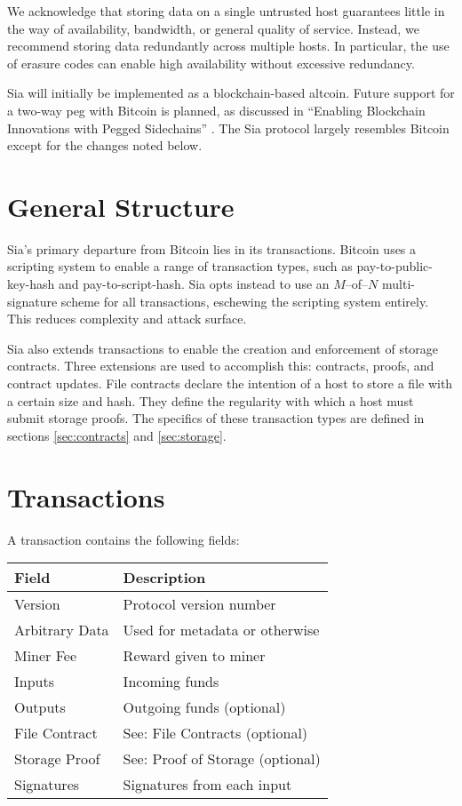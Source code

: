\documentclass[twocolumn]{article}
\begin{document}
We acknowledge that storing data on a single untrusted host guarantees little in the way of availability, bandwidth, or general quality of service.
Instead, we recommend storing data redundantly across multiple hosts.
In particular, the use of erasure codes can enable high availability without excessive redundancy.

Sia will initially be implemented as a blockchain-based altcoin.
Future support for a two-way peg with Bitcoin is planned, as discussed in ``Enabling Blockchain Innovations with Pegged Sidechains'' \cite{side}.
The Sia protocol largely resembles Bitcoin except for the changes noted below.

\section{General Structure}
Sia's primary departure from Bitcoin lies in its transactions.
Bitcoin uses a scripting system to enable a range of transaction types, such as pay-to-public-key-hash and pay-to-script-hash.
Sia opts instead to use an $M$--of--$N$ multi-signature scheme for all transactions, eschewing the scripting system entirely.
This reduces complexity and attack surface.

Sia also extends transactions to enable the creation and enforcement of storage contracts.
Three extensions are used to accomplish this: contracts, proofs, and contract updates.
File contracts declare the intention of a host to store a file with a certain size and hash.
They define the regularity with which a host must submit storage proofs.
The specifics of these transaction types are defined in sections \ref{sec:contracts} and \ref{sec:storage}.

\section{Transactions}
A transaction contains the following fields: \\

\noindent
\begin{tabular}{ l | l }
	\textbf{Field} & \textbf{Description} \\ \hline
	Version        & Protocol version number \\
	Arbitrary Data & Used for metadata or otherwise \\
	Miner Fee      & Reward given to miner \\
	Inputs         & Incoming funds \\
	Outputs        & Outgoing funds (optional) \\
	File Contract  & See: File Contracts (optional) \\
	Storage Proof  & See: Proof of Storage (optional) \\
	Signatures     & Signatures from each input \\
\end{tabular}
\end{document}
